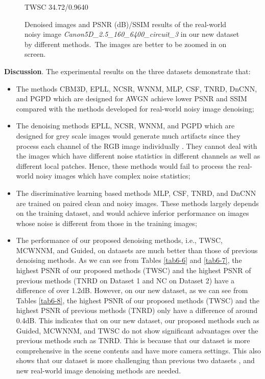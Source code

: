 \begin{figure}
{\begin{minipage}[t]{0.24\textwidth}
{\footnotesize TWSC 34.72/0.9640}
\end{minipage}
}\vspace{-3mm}
\caption{Denoised images and PSNR (dB)/SSIM results of the real-world noisy image \textsl{Canon5D\_2.5\_160\_6400\_circuit\_3} in our new dataset by different methods.\ The images are better to be zoomed in on screen.}
    \label{fig6-7}
\end{figure}


\textbf{Discussion}. 
The experimental results on the three datasets demonstrate that:
\begin{itemize}
\item The methods CBM3D, EPLL, NCSR, WNNM, MLP, CSF, TNRD, DnCNN, and PGPD which are designed for AWGN achieve lower PSNR and SSIM compared with the methods developed for real-world noisy image denoising;

\item The denoising methods EPLL, NCSR, WNNM, and PGPD which are designed for grey scale images would generate much artifacts since they process each channel of the RGB image individually \cite{srcolor}. They cannot deal with the images which have different noise statistics in different channels as well as different local patches. Hence, these methods would fail to process the real-world noisy images which have complex noise statistics;

\item The discriminative learning based methods MLP, CSF, TNRD, and DnCNN are trained on paired clean and noisy images. These methods largely depends on the training dataset, and would achieve inferior performance on images whose noise is different from those in the training images;

\item The performance of our proposed denoising methods, i.e., TWSC, MCWNNM, and Guided, on datasets \cite{crosschannel2016,dnd2017} are much better than those of previous denoising methods. As we can see from Tables \ref{tab6-6} and \ref{tab6-7}, the highest PSNR of our proposed methods (TWSC) and the highest PSNR of previous methods (TNRD on Dataset 1 and NC on Dataset 2) have a difference of over 1.2dB. However, on our new dataset, as we can see from Tables \ref{tab6-8}, the highest PSNR of our proposed methods (TWSC) and the highest PSNR of previous methods (TNRD) only have a difference of around 0.4dB. This indicates that on our new dataset, our proposed methods such as Guided, MCWNNM, and TWSC do not show significant advantages over the previous methods such as TNRD. This is because that our dataset is more comprehensive in the scene contents and have more camera settings. This also shows that our dataset is more challenging than previous two datasets \cite{crosschannel2016,dnd2017}, and new real-world image denoising methods are needed.
  
\end{itemize}



